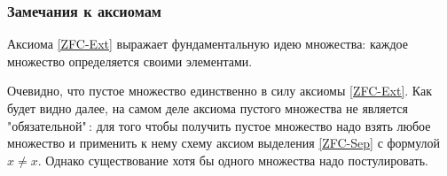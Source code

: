 \documentclass{article}
\begin{document}
\subsubsection{Замечания к аксиомам}

    \begin{remark}
        \label{rem:zfc-ext}
        Аксиома \ref{ZFC-Ext} выражает фундаментальную идею множества: каждое множество определяется своими элементами.
    \end{remark}

    \begin{remark}
        \label{rem:zfc-empty}
        Очевидно, что пустое множество единственно в силу аксиомы \ref{ZFC-Ext}. Как будет видно далее, на самом деле аксиома пустого множества не является "обязательной"\,: для того чтобы получить пустое множество надо взять любое множество и применить к нему схему аксиом выделения \ref{ZFC-Sep} с формулой \(x \ne x\). Однако существование хотя бы одного множества надо постулировать.
    \end{remark}
\end{document}
